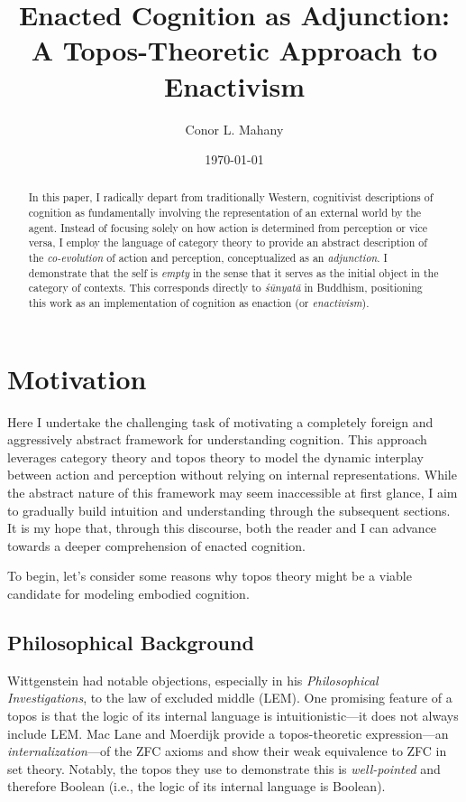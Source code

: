 \documentclass{article}
\title{Enacted Cognition as Adjunction: A Topos-Theoretic Approach to Enactivism}
\author{Conor L. Mahany}
\date{\today}
\begin{document}
\maketitle

\begin{abstract}
In this paper, I radically depart from traditionally Western, cognitivist descriptions of cognition as fundamentally involving the representation of an external world by the agent. Instead of focusing solely on how action is determined from perception or vice versa, I employ the language of category theory to provide an abstract description of the \emph{co-evolution} of action and perception, conceptualized as an \emph{adjunction}. I demonstrate that the self is \emph{empty} in the sense that it serves as the initial object in the category of contexts. This corresponds directly to \emph{śūnyatā} in Buddhism, positioning this work as an implementation of cognition as enaction (or \emph{enactivism}).
\end{abstract}

\tableofcontents

\section{Motivation}

Here I undertake the challenging task of motivating a completely foreign and aggressively abstract framework for understanding cognition. This approach leverages category theory and topos theory to model the dynamic interplay between action and perception without relying on internal representations. While the abstract nature of this framework may seem inaccessible at first glance, I aim to gradually build intuition and understanding through the subsequent sections. It is my hope that, through this discourse, both the reader and I can advance towards a deeper comprehension of enacted cognition.

To begin, let's consider some reasons why topos theory might be a viable candidate for modeling embodied cognition.

\subsection{Philosophical Background}

Wittgenstein had notable objections, especially in his \emph{Philosophical Investigations}, to the law of excluded middle (LEM). One promising feature of a topos is that the logic of its internal language is intuitionistic---it does not always include LEM. Mac Lane and Moerdijk provide a topos-theoretic expression---an \emph{internalization}---of the ZFC axioms and show their weak equivalence to ZFC in set theory. Notably, the topos they use to demonstrate this is \emph{well-pointed} and therefore Boolean (i.e., the logic of its internal language is Boolean).
\end{document}
